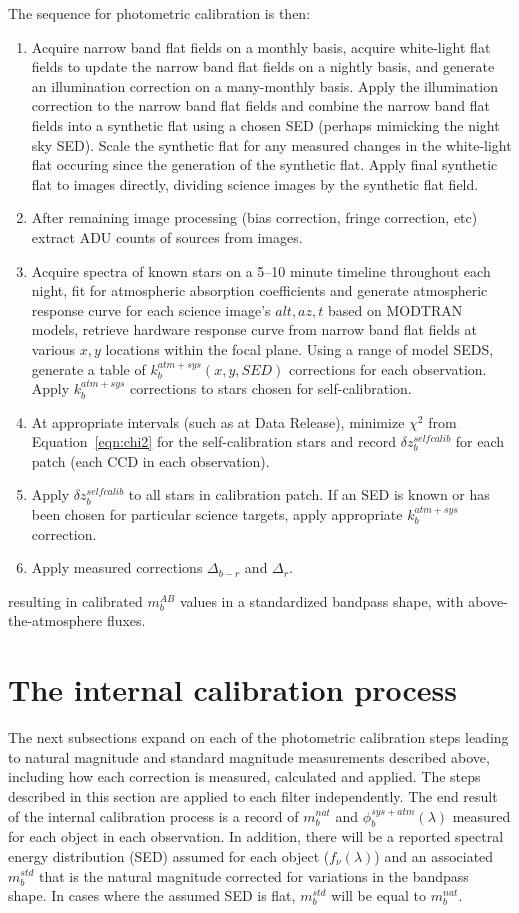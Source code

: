 \documentclass[12pt,preprint]{aastex}
\begin{document}
The sequence for photometric calibration is then:
\begin{enumerate}
\item{Acquire narrow band flat fields on a monthly basis, acquire
white-light flat fields to update the narrow band flat fields on a
nightly basis, and generate an illumination correction on a
many-monthly basis. Apply the illumination correction to the narrow
band flat fields and combine the narrow band flat fields into a
synthetic flat using a chosen SED (perhaps mimicking the night sky
SED). Scale the synthetic flat for any measured changes in the
white-light flat occuring since the generation of the synthetic
flat. Apply final synthetic flat to images directly, dividing science 
images by the synthetic flat field.}
\item{After remaining image processing (bias correction, fringe correction, etc)
extract ADU counts of sources from images. }
\item{Acquire spectra of known stars on a 5--10 minute timeline
throughout each night, fit for atmospheric absorption coefficients 
and generate atmospheric response curve for each science image's
$alt,az,t$ based on MODTRAN models, retrieve hardware
response curve from narrow band flat fields at various $x,y$ locations
within the focal plane. Using a range of model SEDS, generate a table
of $k_b^{atm+sys}(x,y,SED)$ corrections for each observation. Apply
$k_b^{atm+sys}$ corrections to stars chosen for self-calibration.}
\item{At appropriate intervals (such as at Data Release), minimize
$\chi^2$ from Equation~\ref{eqn:chi2} for the self-calibration stars
and record $\delta z_b^{selfcalib}$ for each patch (each CCD in each
observation).}
\item{Apply $\delta z_b^{selfcalib}$ to all stars in calibration
patch. If an SED is known or has been chosen for particular science
targets, apply appropriate $k_b^{atm+sys}$ correction.}
\item{Apply measured corrections $\Delta_{b-r}$ and $\Delta_r$.}
\end{enumerate}
resulting in calibrated $m_b^{AB}$ values in a standardized bandpass shape, 
with above-the-atmosphere fluxes. 

\section{The internal calibration process}
\label{sec:calib_details}

The next subsections expand on each of the photometric calibration steps
leading to natural magnitude and standard magnitude measurements described above, including
how each correction is measured, calculated and applied.  The steps
described in this section are applied to each filter
independently. The end result of the internal calibration process is a
record of $m_b^{nat}$ and $\phi_b^{sys+atm}(\lambda)$ measured for
each object in each observation. In addition, there will be a reported
spectral energy distribution (SED) assumed for each object
($f_\nu(\lambda)$) and an associated $m_b^{std}$ that is the natural
magnitude corrected for variations in the bandpass shape. In cases
where the assumed SED is flat, $m_b^{std}$ will be equal to
$m_b^{nat}$. 
 
\end{document}
